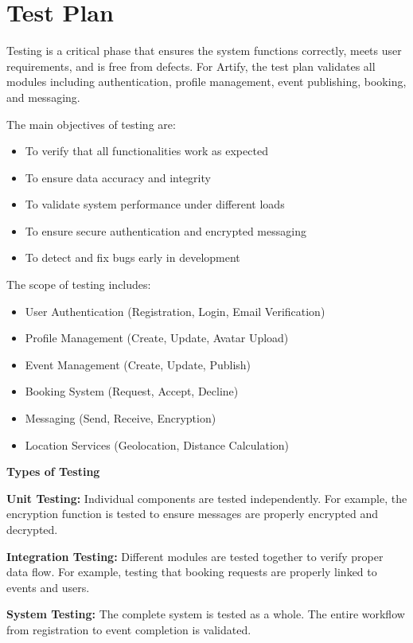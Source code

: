 \documentclass[12pt,a4paper]{report}
\begin{document}
\section{Test Plan}

Testing is a critical phase that ensures the system functions correctly, meets user requirements, and is free from defects. For Artify, the test plan validates all modules including authentication, profile management, event publishing, booking, and messaging.

The main objectives of testing are:
\begin{itemize}
    \item To verify that all functionalities work as expected
    \item To ensure data accuracy and integrity
    \item To validate system performance under different loads
    \item To ensure secure authentication and encrypted messaging
    \item To detect and fix bugs early in development
\end{itemize}

The scope of testing includes:
\begin{itemize}
    \item User Authentication (Registration, Login, Email Verification)
    \item Profile Management (Create, Update, Avatar Upload)
    \item Event Management (Create, Update, Publish)
    \item Booking System (Request, Accept, Decline)
    \item Messaging (Send, Receive, Encryption)
    \item Location Services (Geolocation, Distance Calculation)
\end{itemize}

\textbf{Types of Testing}

\textbf{Unit Testing:}  
Individual components are tested independently. For example, the encryption function is tested to ensure messages are properly encrypted and decrypted.

\textbf{Integration Testing:}  
Different modules are tested together to verify proper data flow. For example, testing that booking requests are properly linked to events and users.

\textbf{System Testing:}  
The complete system is tested as a whole. The entire workflow from registration to event completion is validated.
\end{document}
